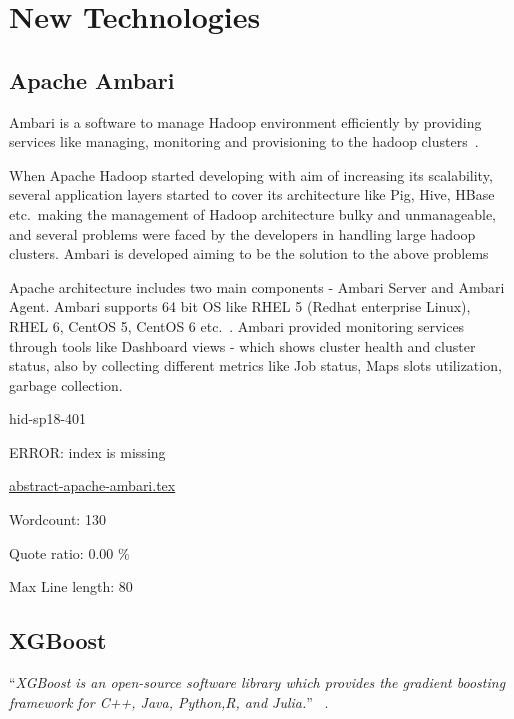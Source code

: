 \chapter{New Technologies}
\section{Apache Ambari}  

Ambari is a software  to manage Hadoop environment
efficiently by providing services like managing, monitoring and provisioning to
the hadoop clusters~\cite{hid-sp18-401-wiki-Ambari}.

When Apache Hadoop started developing with aim of increasing its scalability,
several application layers started to cover its architecture like Pig, Hive,
HBase etc.\ making the management of Hadoop architecture bulky and unmanageable,
and several problems were faced by the developers in handling large hadoop
clusters. Ambari is developed aiming to be the solution to the above problems


Apache architecture includes two main components - Ambari Server and Ambari
Agent. Ambari supports 64 bit OS like RHEL 5 (Redhat enterprise Linux), RHEL 6,
CentOS 5, CentOS 6 etc.~\cite{hid-sp18-401-Ambari}. Ambari provided monitoring
services through tools like Dashboard views - which shows cluster health and
cluster status, also by collecting different metrics like Job status, Maps slots
utilization, garbage collection.



\begin{IU}

hid-sp18-401

ERROR: index is missing

\href{https://github.com/cloudmesh-community/hid-sp18-401/blob/master//technology/abstract-apache-ambari.tex}{abstract-apache-ambari.tex}

 

Wordcount: 130


Quote ratio: 0.00 \%
 
Max Line length: 80
\end{IU}

\section{XGBoost} 

\color{blue}``\emph{XGBoost is an open-source software library which provides the
gradient boosting framework for C++, Java, Python,R, and Julia.}''\color{black}
~\cite{hid-sp18-401-XGBoost-wiki}.

